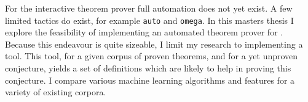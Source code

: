 
For the \coq interactive theorem prover full automation does not yet exist.
A few limited tactics do exist, for example \texttt{auto} and \texttt{omega}.
In this masters thesis I explore the feasibility of implementing an automated theorem prover for \coq.
Because this endeavour is quite sizeable, I limit my research to implementing a \premiseselection tool.
This tool, for a given corpus of proven theorems, and for a yet unproven conjecture, yields a set of definitions which are likely to help in proving this conjecture.
I compare various machine learning algorithms and features for a variety of existing \coq corpora.
